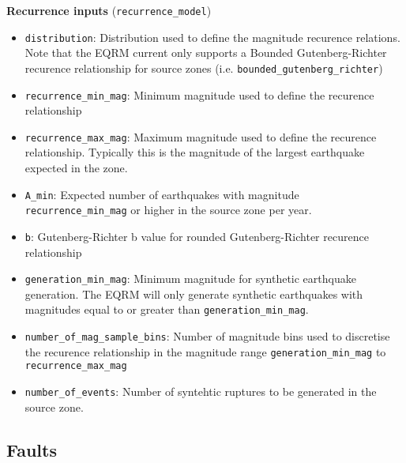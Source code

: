 \textbf{Recurrence inputs} (\texttt{recurrence\_model})
\begin{itemize}
\item \texttt{distribution}: Distribution used to define the magnitude recurence relations. Note that
the EQRM current only supports a Bounded Gutenberg-Richter recurence
relationship for source zones (i.e.
\texttt{bounded}\texttt{\_gutenberg}\texttt{\_richter}) \\
\item \texttt{recurrence\_min\_mag}: Minimum magnitude used to
define the recurence relationship \\
\item \texttt{recurrence\_max\_mag}: Maximum magnitude used to
define the recurence relationship. Typically this is the magnitude
of the largest earthquake expected in the zone. \\
\item \texttt{A\_min}: Expected number of earthquakes with magnitude \texttt{recurrence\_min\_mag}
or higher in the source zone per year.
\item \texttt{b}: Gutenberg-Richter b value for rounded Gutenberg-Richter recurence
relationship \\
\item \texttt{generation\_min\_mag}: Minimum magnitude for synthetic
earthquake generation. The EQRM will only generate synthetic
earthquakes with magnitudes equal to or greater than
\texttt{generation\_min\_mag}. \\
\item \texttt{number\_of\_mag\_sample\_bins}: Number of magnitude
bins used to discretise the recurence relationship in the magnitude
range \texttt{generation\_min\_mag} to
\texttt{recurrence\_max\_mag} \\
\item \texttt{number\_of\_events}: Number of syntehtic ruptures to
be generated in the source zone.
\end{itemize}

\subsection{Faults}

